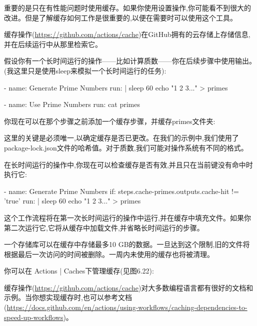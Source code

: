 
重要的是只在有性能问题时使用缓存。如果你使用设置操作,你可能看不到很大的改进。但是了解缓存如何工作是很重要的,以便在需要时可以使用这个工具。

缓存操作(\url{https://github.com/actions/cache})在GitHub拥有的云存储上存储信息,并在后续运行中从那里检索它。

假设你有一个长时间运行的操作——比如计算质数——你在后续步骤中使用输出。(我这里只是使用sleep来模拟一个长时间运行的任务):

\begin{shell}
- name: Generate Prime Numbers
  run: |
    sleep 60
    echo "1 2 3..." > primes

- name: Use Prime Numbers
  run: cat primes
\end{shell}

你现在可以在那个步骤之前添加一个缓存步骤，并缓存primes文件夹:


这里的关键是必须唯一,以确定缓存是否已更改。在我们的示例中,我们使用了package-lock.json文件的哈希值。对于质数,我们可能对操作系统有不同的格式。

在长时间运行的操作中,你现在可以检查缓存是否有效,并且只在当前键没有命中时执行它:

\begin{shell}
- name: Generate Prime Numbers
  if: steps.cache-primes.outputs.cache-hit != 'true'
  run: |
    sleep 60
    echo "1 2 3..." > primes
\end{shell}

这个工作流程将在第一次长时间运行的操作中运行,并在缓存中填充文件。如果你第二次运行它,它将从缓存中加载文件,并省略长时间运行的步骤。


一个存储库可以在缓存中存储最多10 GB的数据。一旦达到这个限制,旧的文件将根据最后一次访问的时间被删除。一周内未使用的缓存也将被清理。

你可以在 Actions | Caches下管理缓存(见图6.22):


缓存操作(\url{https://github.com/actions/cache})对大多数编程语言都有很好的文档和示例。当你想实现缓存时,也可以参考文档(\url{https://docs.github.com/en/actions/using-workflows/caching-dependencies-to-speed-up-workflows})。